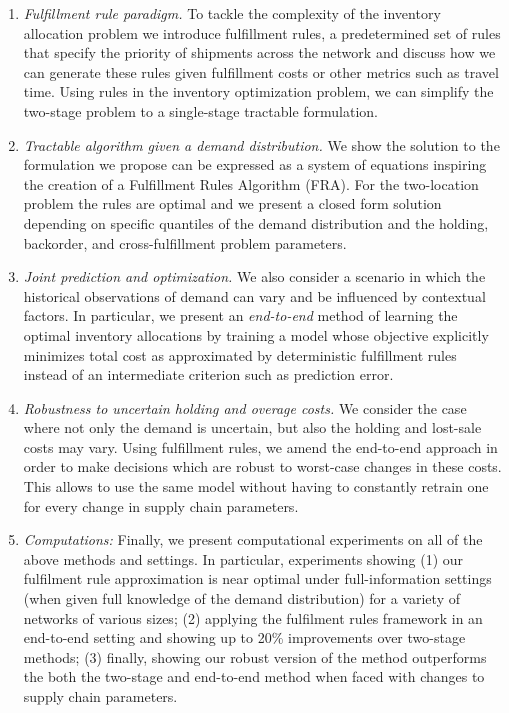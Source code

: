 \documentclass[poms,final,blindrev]{poms1_V1} %
\begin{document}
\begin{enumerate}
    \item \emph{Fulfillment rule paradigm.} To tackle the complexity of the inventory allocation problem we introduce {fulfillment rules}, a predetermined set of rules that specify the priority of shipments across the network and discuss how we can generate these rules given fulfillment costs or other metrics such as travel time. Using rules in the inventory optimization problem, we can simplify the two-stage problem to a single-stage tractable formulation. 
    \item \emph{Tractable algorithm given a demand distribution.} We show the solution to the formulation we propose can be expressed as a system of equations inspiring the creation of a Fulfillment Rules Algorithm (FRA). For the two-location problem the rules are optimal and we present a closed form solution depending on specific quantiles of the demand distribution and the holding, backorder, and cross-fulfillment problem parameters.
    \item \emph{Joint prediction and optimization.} We also consider a scenario in which the historical observations of demand can vary and be influenced by contextual factors. In particular, we present an \emph{end-to-end} method of learning the optimal inventory allocations by training a model whose objective explicitly minimizes total cost as approximated by deterministic fulfillment rules instead of an intermediate criterion such as prediction error.
    \item \emph{Robustness to uncertain holding and overage costs.} We consider the case where not only the demand is uncertain, but also the holding and lost-sale costs may vary. Using fulfillment rules, we amend the end-to-end approach in order to make decisions which are robust to worst-case changes in these costs. This allows to use the same model without having to constantly retrain one for every change in supply chain parameters.
    \item \emph{Computations:} Finally, we present computational experiments on all of the above methods and settings. In particular, experiments showing (1) our fulfilment rule approximation is near optimal under full-information settings (when given full knowledge of the demand distribution) for a variety of networks of various sizes; (2) applying the fulfilment rules framework in an end-to-end setting and showing up to 20\% improvements over two-stage methods; (3) finally, showing our robust version of the method outperforms the both the two-stage and end-to-end method when faced with changes to supply chain parameters.
\end{enumerate} 
\end{document}
